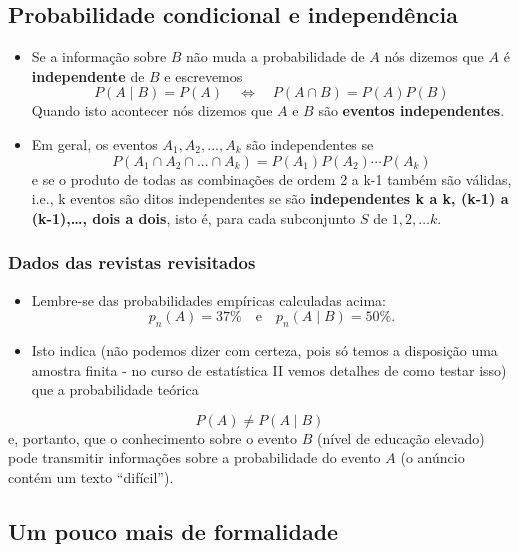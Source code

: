 \documentclass[]{article}
\providecommand{\tightlist}{%
  \setlength{\itemsep}{0pt}\setlength{\parskip}{0pt}}
\begin{document}
\subsection{Probabilidade condicional e
independência}\label{probabilidade-condicional-e-independencia}

\begin{itemize}
\tightlist
\item
  Se a informação sobre \(B\) não muda a probabilidade de \(A\) nós
  dizemos que \(A\) é \textbf{independente} de \(B\) e escrevemos \[
    P(A \mid B) = P(A) \quad \Leftrightarrow  \quad P(A \cap B) = P(A)P(B)
    \] Quando isto acontecer nós dizemos que \(A\) e \(B\) são
  \textbf{eventos independentes}.
\item
  Em geral, os eventos \(A_1, A_2, ..., A_k\) são independentes se \[
    P(A_1 \cap A_2 \cap ... \cap A_k) = P(A_1) P(A_2) \cdots P(A_k)
    \] e se o produto de todas as combinações de ordem 2 a k-1 também
  são válidas, i.e., k eventos são ditos independentes se são
  \textbf{independentes k a k, (k-1) a (k-1),\ldots{}, dois a dois},
  isto é, para cada subconjunto \(S\) de \({1, 2,\ldots k}\).
\end{itemize}

\subsubsection{Dados das revistas
revisitados}\label{dados-das-revistas-revisitados}

\begin{itemize}
\tightlist
\item
  Lembre-se das probabilidades empíricas calculadas acima: \[
  p_n(A) = 37 \%
  \quad \text{e} \quad
  p_n(A \mid B) = 50\%.
  \]
\item
  Isto indica (não podemos dizer com certeza, pois só temos a disposição
  uma amostra finita - no curso de estatística II vemos detalhes de como
  testar isso) que a probabilidade teórica
\end{itemize}

\[
P(A) \neq P(A \mid B)
\] e, portanto, que o conhecimento sobre o evento \(B\) (nível de
educação elevado) pode transmitir informações sobre a probabilidade do
evento \(A\) (o anúncio contém um texto ``difícil'').

\subsection{Um pouco mais de
formalidade}\label{um-pouco-mais-de-formalidade}
\end{document}
